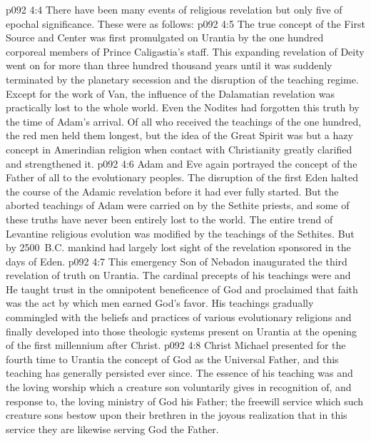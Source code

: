 \pc \vs p092 4:4 There have been many events of religious revelation but only five of epochal significance. These were as follows:
\pc \vs p092 4:5 \bibnobreakspace {} The true concept of the First Source and Center was first promulgated on Urantia by the one hundred corporeal members of Prince Caligastia’s staff. This expanding revelation of Deity went on for more than three hundred thousand years until it was suddenly terminated by the planetary secession and the disruption of the teaching regime. Except for the work of Van, the influence of the Dalamatian revelation was practically lost to the whole world. Even the Nodites had forgotten this truth by the time of Adam’s arrival. Of all who received the teachings of the one hundred, the red men held them longest, but the idea of the Great Spirit was but a hazy concept in Amerindian religion when contact with Christianity greatly clarified and strengthened it.
\pc \vs p092 4:6 \bibnobreakspace {} Adam and Eve again portrayed the concept of the Father of all to the evolutionary peoples. The disruption of the first Eden halted the course of the Adamic revelation before it had ever fully started. But the aborted teachings of Adam were carried on by the Sethite priests, and some of these truths have never been entirely lost to the world. The entire trend of Levantine religious evolution was modified by the teachings of the Sethites. But by 2500~B.C. mankind had largely lost sight of the revelation sponsored in the days of Eden.
\pc \vs p092 4:7 \bibnobreakspace {} This emergency Son of Nebadon inaugurated the third revelation of truth on Urantia. The cardinal precepts of his teachings were  and  He taught trust in the omnipotent beneficence of God and proclaimed that faith was the act by which men earned God’s favor. His teachings gradually commingled with the beliefs and practices of various evolutionary religions and finally developed into those theologic systems present on Urantia at the opening of the first millennium after Christ.
\pc \vs p092 4:8 \bibnobreakspace {} Christ Michael presented for the fourth time to Urantia the concept of God as the Universal Father, and this teaching has generally persisted ever since. The essence of his teaching was  and  the loving worship which a creature son voluntarily gives in recognition of, and response to, the loving ministry of God his Father; the freewill service which such creature sons bestow upon their brethren in the joyous realization that in this service they are likewise serving God the Father.
